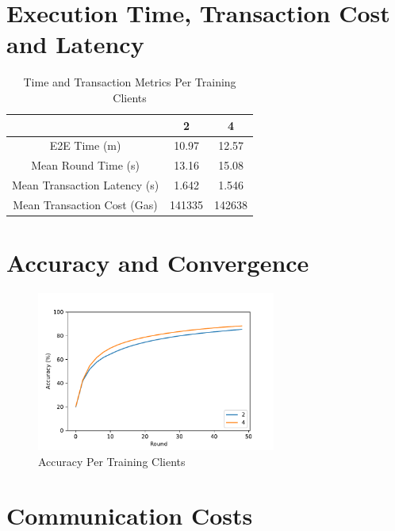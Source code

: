 \section{Execution Time, Transaction Cost and Latency}

\begin{table}[!ht]
\begin{tabular}{c|c|c} \hline \hline
                                & 2             & 4             \\ \hline \hline
E2E Time (m)                    & 10.97	        & 12.57         \\ \hline
Mean Round Time (s)             & 13.16	        & 15.08         \\ \hline
Mean Transaction Latency (s)    & 1.642	        & 1.546         \\ \hline
Mean Transaction Cost (Gas)     & 141335        & 142638        \\ \hline
\end{tabular}
\caption{Time and Transaction Metrics Per Training Clients}
\label{tab:metrics_vertical}
\end{table}

\section{Accuracy and Convergence}

\begin{figure}[!ht]
    \centering
    \centering
    \includegraphics[width=0.7\textwidth]{graphics/vertical/accuracy.pdf}
    \caption{Accuracy Per Training Clients}
    \label{fig:accuracy_vertical}
\end{figure}

\section{Communication Costs}

